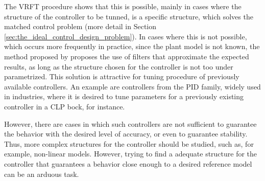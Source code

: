 The VRFT procedure shows that this is possible, mainly in cases where the structure of the controller to be tunned, is a specific structure, which solves the matched control problem (more detail in Section \ref{sec:the_ideal_control_design_problem}). In cases where this is not possible, which occurs more frequently in practice, since the plant model is not known, the method proposed by \cite{campi2002, campi2006} proposes the use of filters that approximate the expected results, as long as the structure chosen for the controller is not too under parametrized. This solution is attractive for tuning procedure of  previously available controllers. An example are controllers from the PID family, widely used in industries, where it is desired to tune parameters for a previously existing controller in a CLP bock, for instance.

However, there are cases in which such controllers are not sufficient to guarantee the behavior with the desired level of accuracy, or even to guarantee stability. Thus, more complex structures for the controller should be studied, such as, for example, non-linear models. However, trying to find a adequate structure for the controller that guarantees a behavior close enough to a desired reference model can be an arduous task.

